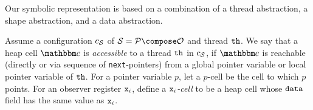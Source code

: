 Our symbolic representation is based on a combination of a thread abstraction, a
shape  abstraction, and a data abstraction.

Assume a configuration $c_{\mathcal S}$ of $\system=\prog\compose\observer$
and thread ${\tt th}$.
We say that a heap cell $\cell$ is {\em accessible} to a thread ${\tt th}$
in $c_{\mathcal S}$,
if $\cell$ is reachable (directly or via sequence of
{\tt next}-pointers) from a global pointer variable or local pointer
variable of ${\tt th}$.
For a pointer variable $p$, let a $p$-cell be the cell to which $p$ points.
For an observer register $\mathtt{x}_i$,  define a
{\em $\mathtt{x}_i$-cell} to be a heap cell whose
${\tt data}$ field has the same value as $\mathtt{x}_i$.
